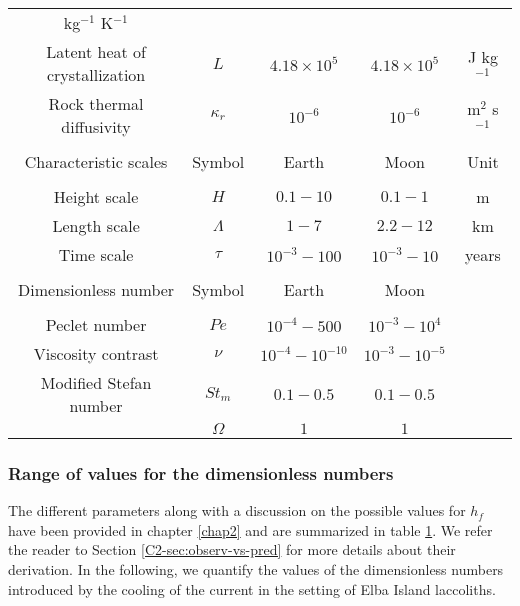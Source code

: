 \begin{table}[h!]
\begin{center}
{\begin{tabular}{c|c|c|c|c}
                                                                      kg$^{-1}$ K$^{-1}$\\
        Latent       heat       of      crystallization&       $L$       &
                                                                           $4.18\times10^5$&$4.18\times10^5$& J kg$^{-1}$\\
        Rock  thermal  diffusivity  &$\kappa_r$& $10^{-6}$  &$10^{-6}$  &
                                                                          m$^{2}$
                                                                          s$^{-1}$\\
                  &&&&\\
        \hline
        Characteristic scales & Symbol & Earth & Moon&Unit\\
        \hline
                  &&&&\\
        Height scale & $H$& $0.1-10$ &$0.1-1$ &m \\
        Length scale & $\Lambda$ & $1-7$&$2.2-12$& km \\
        Time scale & $\tau$ & $10^{-3}-100$&$10^{-3}-10$& years \\
                  &&&&\\
        \hline
        Dimensionless number & Symbol & Earth & Moon&\\
        \hline
                  &&&&\\
        Peclet number &$Pe$& $10^{-4}-500$&$10^{-3}-10^4$ &\\
        Viscosity contrast & $\nu$ & $10^{-4}-10^{-10}$& $10^{-3}-10^{-5}$&\\
        Modified Stefan number & $St_m$ & $0.1-0.5$ &  $0.1-0.5$ &\\
                  &$\Omega$ & $1$ & $1$&
                                         \label{C4-tab2}
      \end{tabular} 
    }
  \end{center}
  \label{C4-tab}
\end{table}

\subsubsection*{Range of values for the dimensionless numbers}
\label{C4-sec:range-valu-dimens}
 
The  different parameters  along  with a  discussion  on the  possible
values for  $h_f$ have  been provided in  chapter \ref{chap2}  and are
summarized  in table  \ref{C4-tab}.  We  refer the  reader to  Section
\ref{C2-sec:observ-vs-pred} for  more details about  their derivation.
In the following, we quantify  the values of the dimensionless numbers
introduced by the cooling of the current in the setting of Elba Island
laccoliths.

